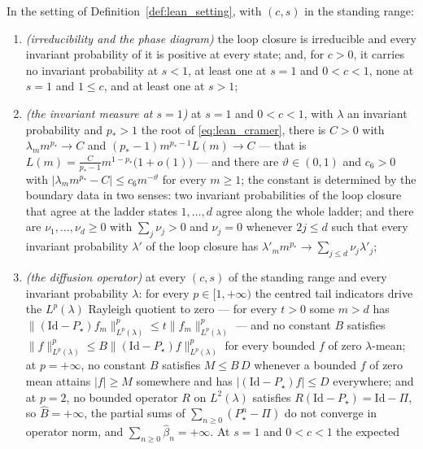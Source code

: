 \begin{theorem}\label{theo:lean_main}
In the setting of Definition~\ref{def:lean_setting}, with $(c,s)$ in the standing range:
\begin{enumerate}
    \item \emph{(irreducibility and the phase diagram)} the loop closure is irreducible and
    every invariant probability of it is positive at every state; and, for $c>0$, it carries no
    invariant probability at $s<1$, at least one at $s=1$ and $0<c<1$, none at $s=1$ and
    $1\leq c$, and at least one at $s>1$;
    \item \emph{(the invariant measure at $s=1$)} at $s=1$ and $0<c<1$, with $\lambda$ an
    invariant probability and $p_*>1$ the root of \eqref{eq:lean_cramer}, there is $C>0$ with
    $\lambda_m m^{p_*}\rightarrow C$ and $(p_*-1)m^{p_*-1}L(m)\rightarrow C$ --- that is
    $L(m)=\frac C{p_*-1}m^{1-p_*}\bigl(1+o(1)\bigr)$ --- and there are $\vartheta\in(0,1)$ and
    $c_6>0$ with $\left|\lambda_m m^{p_*}-C\right|\leq c_6m^{-\vartheta}$ for every $m\geq1$;
    the constant is determined by the boundary data in two senses: two invariant probabilities
    of the loop closure that agree at the ladder states $1,\dots,d$ agree along the whole
    ladder; and there are $\nu_1,\dots,\nu_d\geq0$ with $\sum_j\nu_j>0$ and $\nu_j=0$
    whenever $2j\leq d$ such that every invariant probability $\lambda'$ of the loop closure
    has $\lambda'_m m^{p_*}\rightarrow\sum_{j\leq d}\nu_j\lambda'_j$;
    \item \emph{(the diffusion operator)} at every $(c,s)$ of the standing range and every
    invariant probability $\lambda$: for every $p\in[1,+\infty)$ the centred tail indicators
    drive the $L^p(\lambda)$ Rayleigh quotient to zero --- for every $t>0$ some $m>d$ has
    $\|(\mathrm{Id}-P_\star)f_m\|^p_{L^p(\lambda)}\leq t\|f_m\|^p_{L^p(\lambda)}$ --- and no
    constant $B$ satisfies $\|f\|^p_{L^p(\lambda)}\leq B\|(\mathrm{Id}-P_\star)f\|^p_{L^p(\lambda)}$
    for every bounded $f$ of zero $\lambda$-mean; at $p=+\infty$, no constant $B$ satisfies
    $M\leq B\,D$ whenever a bounded $f$ of zero mean attains $|f|\geq M$ somewhere and has
    $|(\mathrm{Id}-P_\star)f|\leq D$ everywhere; and at $p=2$, no bounded operator $R$ on
    $L^2(\lambda)$ satisfies $R(\mathrm{Id}-P_\star)=\mathrm{Id}-\Pi$, so $\widehat B=+\infty$,
    the partial sums of $\sum_{n\geq0}(P_\star^n-\Pi)$ do not converge in operator norm, and
    $\sum_{n\geq0}\widehat\beta_n=+\infty$. At $s=1$ and $0<c<1$ the expected

\end{enumerate}
\end{theorem}
